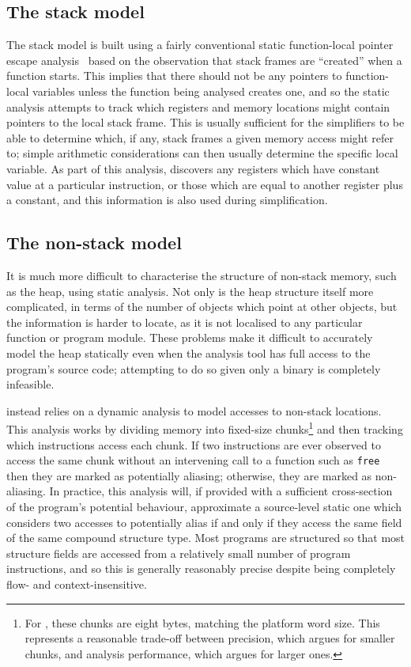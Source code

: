 \subsection{The stack model}
The stack model is built using a fairly conventional static
function-local pointer escape analysis~\cite[pages
  140--141]{Appel2004} based on the observation that stack frames are
``created'' when a function starts.  This implies that there should
not be any pointers to function-local variables unless the function
being analysed creates one, and so the static analysis attempts to
track which registers and memory locations might contain pointers to
the local stack frame.  This is usually sufficient for the
{\StateMachine} simplifiers to be able to determine which, if any,
stack frames a given memory access might refer to; simple arithmetic
considerations can then usually determine the specific local variable.
As part of this analysis, {\technique} discovers any registers which
have constant value at a particular instruction, or those which are
equal to another register plus a constant, and this information is
also used during {\StateMachine} simplification.

\subsection{The non-stack model}
It is much more difficult to characterise the structure of non-stack
memory, such as the heap, using static analysis.  Not only is the heap
structure itself more complicated, in terms of the number of objects
which point at other objects, but the information is harder to locate,
as it is not localised to any particular function or program module.
These problems make it difficult to accurately model the heap
statically even when the analysis tool has full access to the
program's source code; attempting to do so given only a binary is
completely infeasible.

{\Technique} instead relies on a dynamic analysis to model accesses to
non-stack locations.  This analysis works by dividing memory into
fixed-size chunks\footnote{For {\implementation}, these chunks are
  eight bytes, matching the platform word size. This represents a
  reasonable trade-off between precision, which argues for smaller
  chunks, and analysis performance, which argues for larger ones.} and
then tracking which instructions access each chunk.  If two
instructions are ever observed to access the same chunk without an
intervening call to a function such as \texttt{free} then they are
marked as potentially aliasing; otherwise, they are marked as
non-aliasing.  In practice, this analysis will, if provided with a
sufficient cross-section of the program's potential behaviour,
approximate a source-level static one which considers two accesses to
potentially alias if and only if they access the same field of the
same compound structure type.  Most programs are structured so that
most structure fields are accessed from a relatively small number of
program instructions, and so this is generally reasonably precise
despite being completely flow- and context-insensitive.

